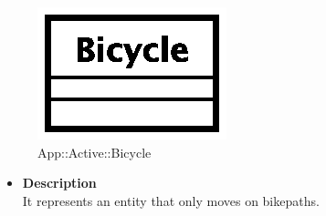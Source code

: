 \begin{figure}[h]
\centering
\includegraphics[scale=0.6,keepaspectratio]{images/solution/bicycle.eps}
\caption{App::Active::Bicycle}
\label{fig:sd-app-bicycle}
\end{figure}
\FloatBarrier
\begin{itemize}
  \item \textbf{Description} \\
It represents an entity that only moves on bikepaths.
\end{itemize} 

